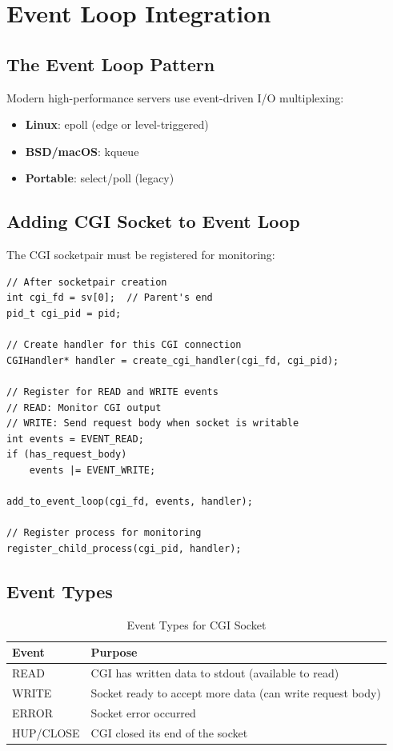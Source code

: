 \documentclass[12pt,a4paper]{article}
\begin{document}
\section{Event Loop Integration}

\subsection{The Event Loop Pattern}

Modern high-performance servers use event-driven I/O multiplexing:
\begin{itemize}
    \item \textbf{Linux}: epoll (edge or level-triggered)
    \item \textbf{BSD/macOS}: kqueue
    \item \textbf{Portable}: select/poll (legacy)
\end{itemize}

\subsection{Adding CGI Socket to Event Loop}

The CGI socketpair must be registered for monitoring:

\begin{lstlisting}[caption=Event Loop Registration]
// After socketpair creation
int cgi_fd = sv[0];  // Parent's end
pid_t cgi_pid = pid;

// Create handler for this CGI connection
CGIHandler* handler = create_cgi_handler(cgi_fd, cgi_pid);

// Register for READ and WRITE events
// READ: Monitor CGI output
// WRITE: Send request body when socket is writable
int events = EVENT_READ;
if (has_request_body)
    events |= EVENT_WRITE;

add_to_event_loop(cgi_fd, events, handler);

// Register process for monitoring
register_child_process(cgi_pid, handler);
\end{lstlisting}

\subsection{Event Types}

\begin{table}[h]
\centering
\begin{tabular}{|l|p{8cm}|}
\hline
\textbf{Event} & \textbf{Purpose} \\
\hline
READ & CGI has written data to stdout (available to read) \\
\hline
WRITE & Socket ready to accept more data (can write request body) \\
\hline
ERROR & Socket error occurred \\
\hline
HUP/CLOSE & CGI closed its end of the socket \\
\hline
\end{tabular}
\caption{Event Types for CGI Socket}
\end{table}
\end{document}
